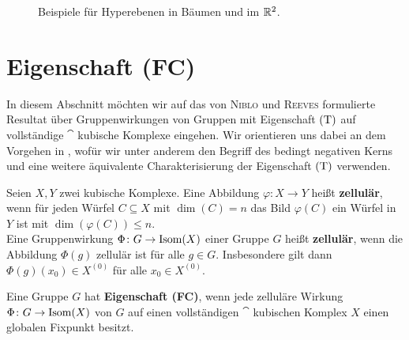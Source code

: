 \begin{beispiel}
\begin{itemize}
\begin{figure}[h]
		\caption{Beispiele für Hyperebenen in Bäumen und im $\mathbb{R}^2$.}
	\end{figure}
\end{itemize}
\end{beispiel}

\section{Eigenschaft (FC)}
\label{sec:property_FC}
	In diesem Abschnitt möchten wir auf das von \textsc{Niblo} und \textsc{Reeves} formulierte Resultat über Gruppenwirkungen von Gruppen mit Eigenschaft $\operatorname{(T)}$ auf vollständige $\cat$ kubische Komplexe eingehen. Wir orientieren uns dabei an dem Vorgehen in \cite{NibloReeves}, wofür wir unter anderem den Begriff des bedingt negativen Kerns und eine weitere äquivalente Charakterisierung der Eigenschaft $\operatorname{(T)}$ verwenden.
	
\begin{definition}
	Seien $X, Y$ zwei kubische Komplexe. Eine Abbildung $\varphi \colon X \rightarrow Y$ heißt \textbf{zellulär}, wenn für jeden Würfel $C \subseteq X$ mit $\dim(C) = n$ das Bild $\varphi(C)$ ein Würfel in $Y$ ist mit $\dim(\varphi(C)) \leq n$. \\
	Eine Gruppenwirkung $\Phi \colon G \rightarrow \operatorname{Isom}(X)$ einer Gruppe $G$ heißt \textbf{zellulär}, wenn die Abbildung $\Phi(g)$ zellulär ist für alle $g \in G$. Insbesondere gilt dann $\Phi(g)(x_0) \in X^{(0)}$ für alle $x_0 \in X^{(0)}$.
\end{definition}
\newpage
\begin{definition}
	Eine Gruppe $G$ hat \textbf{Eigenschaft (FC)}, wenn jede zelluläre Wirkung $\Phi \colon G \rightarrow \operatorname{Isom}(X)$ von $G$ auf einen vollständigen $\cat$ kubischen Komplex $X$ einen globalen Fixpunkt besitzt.
\end{definition}

